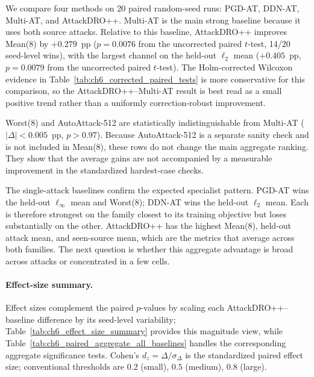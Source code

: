 We compare four methods on 20 paired random-seed runs: PGD-AT,
DDN-AT, Multi-AT, and AttackDRO++.
Multi-AT is the main strong baseline because it uses both source attacks.
Relative to this baseline, AttackDRO++ improves Mean(8) by $+0.279$~pp
($p = 0.0076$ from the uncorrected paired $t$-test, 14/20 seed-level wins),
with the largest channel on the held-out $\ell_2$ mean ($+0.405$~pp,
$p = 0.0079$ from the uncorrected paired $t$-test). The Holm-corrected
Wilcoxon evidence in Table~\ref{tab:ch6_corrected_paired_tests} is more
conservative for this comparison, so the AttackDRO++--Multi-AT result is best
read as a small positive trend rather than a uniformly correction-robust
improvement.

Worst(8) and
AutoAttack-512 are statistically indistinguishable from Multi-AT
($|\Delta| < 0.005$~pp, $p > 0.97$). Because AutoAttack-512 is a separate
sanity check and is not included in Mean(8), these rows do not change the main
aggregate ranking. They show that the average gains are not accompanied by a
measurable improvement in the standardized hardest-case checks.

The single-attack baselines confirm the expected specialist pattern.
PGD-AT wins the held-out $\ell_\infty$ mean and Worst(8); DDN-AT wins the
held-out $\ell_2$ mean. Each is therefore strongest on the family closest to
its training objective but loses substantially on the other. AttackDRO++ has
the highest Mean(8), held-out attack mean, and seen-source mean, which are the
metrics that average across both families. The next question is whether this
aggregate advantage is broad across attacks or concentrated in a few cells.

\paragraph{Effect-size summary.}
Effect sizes complement the paired $p$-values by scaling each AttackDRO++--baseline
difference by its seed-level variability; Table~\ref{tab:ch6_effect_size_summary}
provides this magnitude view, while Table~\ref{tab:ch6_paired_aggregate_all_baselines}
handles the corresponding aggregate significance tests. Cohen's
$d_z = \Delta / \sigma_\Delta$ is the standardized paired effect size; conventional
thresholds are $0.2$ (small), $0.5$ (medium), $0.8$ (large).

